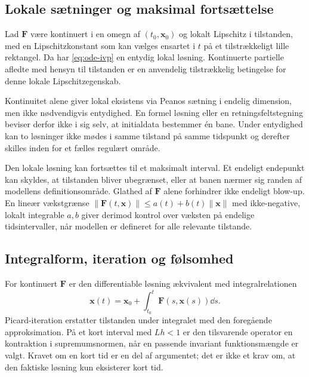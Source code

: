 \subsection{Lokale sætninger og maksimal fortsættelse}
\begin{samepage}
\begin{saetning}
Lad $\boldsymbol{F}$ være kontinuert i en omegn af
$(t_0,\boldsymbol{x}_0)$ og lokalt Lipschitz i tilstanden, med en
Lipschitzkonstant som kan vælges ensartet i $t$ på et tilstrækkeligt
lille rektangel. Da har \eqref{eq:ode-ivp} en entydig lokal løsning.
Kontinuerte partielle afledte med hensyn til tilstanden er en
anvendelig tilstrækkelig betingelse for denne lokale Lipschitzegenskab.
\end{saetning}
\end{samepage}
Kontinuitet alene giver lokal eksistens via Peanos sætning i
endelig dimension, men ikke nødvendigvis entydighed. En formel løsning
eller en retningsfeltstegning beviser derfor ikke i sig selv, at
initialdata bestemmer én bane. Under entydighed kan to løsninger ikke
mødes i samme tilstand på samme tidspunkt og derefter skilles inden
for et fælles regulært område.

Den lokale løsning kan fortsættes til et maksimalt interval. Et endeligt
endepunkt kan skyldes, at tilstanden bliver ubegrænset, eller at banen
nærmer sig randen af modellens definitionsområde. Glathed af
$\boldsymbol{F}$ alene forhindrer ikke endeligt blow-up. En
lineær vækstgrænse
$\|\boldsymbol{F}(t,\boldsymbol{x})\|\le a(t)+b(t)\|\boldsymbol{x}\|$
med ikke-negative, lokalt integrable $a,b$ giver derimod kontrol over
væksten på endelige tidsintervaller, når modellen er defineret for alle
relevante tilstande.

\subsection{Integralform, iteration og følsomhed}
For kontinuert $\boldsymbol{F}$ er den differentiable løsning ækvivalent
med integralrelationen
\[
 \boldsymbol{x}(t)=\boldsymbol{x}_0+
 \int_{t_0}^{t}\boldsymbol{F}(s,\boldsymbol{x}(s))\dd s.
\]
Picard-iteration erstatter tilstanden under integralet med den foregående
approksimation. På et kort interval med $Lh<1$ er den tilsvarende
operator en kontraktion i supremumsnormen, når en passende invariant
funktionsmængde er valgt. Kravet om en kort tid er en del af argumentet;
det er ikke et krav om, at den faktiske løsning kun eksisterer kort tid.

